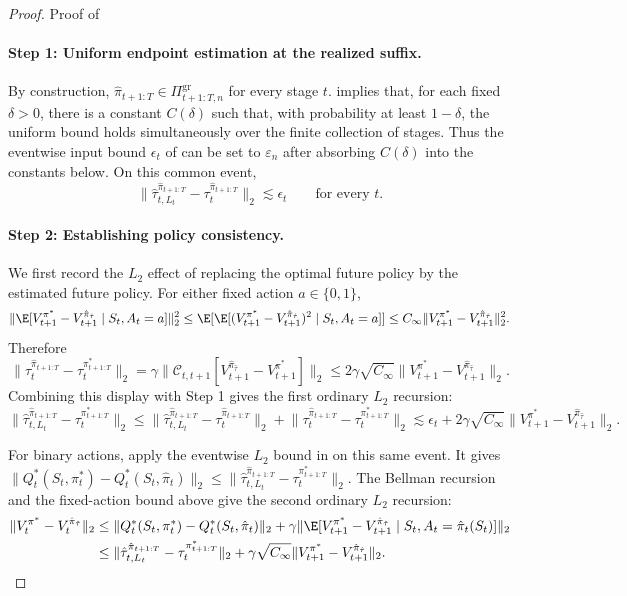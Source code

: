 \documentclass[opre,nonblindrev]{informs4}
\providecommand{\cC}{\mathcal C}
\newcommand{\norm}[1]{\lVert#1\rVert}
\newcommand{\blipadv}{\tau}
\begin{document}
\begin{proof}{Proof of }
\leavevmode
\paragraph{Step 1: Uniform endpoint estimation at the realized suffix.}
By construction,
$\hat\pi_{t+1:T}\in\Pi_{t+1:T,n}^{\mathrm{gr}}$ for every stage $t$.
 implies
that, for each fixed $\delta>0$, there is a constant $C(\delta)$ such that, with
probability at least $1-\delta$, the uniform bound holds simultaneously over
the finite collection of stages. Thus the eventwise input bound $\epsilon_t$
of  can be set to $\varepsilon_n$ after
absorbing $C(\delta)$ into the constants below. On this common event,
\[
\norm{\hat\blipadv_{t,L_t}^{\hat\pi_{t+1:T}}
-\blipadv_t^{\hat\pi_{t+1:T}}}_2
\lesssim
\epsilon_t
\qquad\text{for every }t.
\]


\paragraph{Step 2: Establishing policy consistency.}
We first record the $L_2$ effect of replacing the optimal future policy by
the estimated future policy. For either fixed action $a\in\{0,1\}$,
\[
\norm{\E[V_{t+1}^{\pi^*}-V_{t+1}^{\hat\pi_{\hat\blipadv}}\mid S_t,A_t=a]}_2^2
\le
\E[\E[(V_{t+1}^{\pi^*}-V_{t+1}^{\hat\pi_{\hat\blipadv}})^2
\mid S_t,A_t=a]]
\le
C_\infty\norm{V_{t+1}^{\pi^*}-V_{t+1}^{\hat\pi_{\hat\blipadv}}}_2^2.
\]
Therefore
\begin{equation}
\norm{\blipadv_t^{\hat\pi_{t+1:T}}
-\blipadv_t^{\pi^*_{t+1:T}}}_2
=
\gamma\norm{\cC_{t,t+1}[V_{t+1}^{\hat\pi_{\hat\blipadv}}-V_{t+1}^{\pi^*}]}_2
\le
2\gamma\sqrt{C_\infty}
\norm{V_{t+1}^{\pi^*}-V_{t+1}^{\hat\pi_{\hat\blipadv}}}_2.
\label{eqn-apx-policyopt-inductionstep-decomposition}
\end{equation}
Combining this display with Step 1 gives the first ordinary $L_2$ recursion:
\[
\norm{\hat\blipadv_{t,L_t}^{\hat\pi_{t+1:T}}
-\blipadv_t^{\pi^*_{t+1:T}}}_2
\leq\norm{\hat\blipadv_{t,L_t}^{\hat\pi_{t+1:T}}
-\blipadv_t^{\hat\pi_{t+1:T}}}_2
+\norm{\blipadv_t^{\hat\pi_{t+1:T}}-\blipadv_t^{\pi^*_{t+1:T}}}_2
\lesssim\epsilon_t+2\gamma\sqrt{C_\infty}
\norm{V_{t+1}^{\pi^*}-V_{t+1}^{\hat\pi_{\hat\blipadv}}}_2.
\]

For binary actions, apply the eventwise $L_2$ bound in
 on this same event. It gives
$\norm{Q_t^*(S_t,\pi_t^*)-Q_t^*(S_t,\hat\pi_t)}_2
\le
\norm{\hat\blipadv_{t,L_t}^{\hat\pi_{t+1:T}}
-\blipadv_t^{\pi^*_{t+1:T}}}_2$.
The Bellman recursion and the fixed-action bound above give the second
ordinary $L_2$ recursion:
\begin{align*}
\norm{V_t^{\pi^*}-V_t^{\hat\pi_{\hat\blipadv}}}_2
&\le
\norm{Q_t^*(S_t,\pi_t^*)-Q_t^*(S_t,\hat\pi_t)}_2
+\gamma
\norm{\E[V_{t+1}^{\pi^*}-V_{t+1}^{\hat\pi_{\hat\blipadv}}
\mid S_t,A_t=\hat\pi_t(S_t)]}_2\\
&\le
\norm{\hat\blipadv_{t,L_t}^{\hat\pi_{t+1:T}}
-\blipadv_t^{\pi^*_{t+1:T}}}_2
+\gamma\sqrt{C_\infty}
\norm{V_{t+1}^{\pi^*}-V_{t+1}^{\hat\pi_{\hat\blipadv}}}_2.
\end{align*}


\end{proof}
\end{document}
